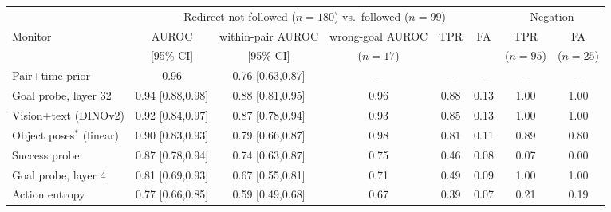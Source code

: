 \begin{tabular}{lccccccc}
\toprule
 & \multicolumn{5}{c}{Redirect not followed ($n{=}180$) vs.\ followed ($n{=}99$)} & \multicolumn{2}{c}{Negation} \\
\cmidrule(lr){2-6}\cmidrule(lr){7-8}
Monitor & AUROC & within-pair AUROC & wrong-goal AUROC & TPR & FA & TPR & FA \\
 & [95\% CI] & [95\% CI] & ($n{=}17$) & & & ($n{=}95$) & ($n{=}25$) \\
\midrule
Pair+time prior & 0.96 & 0.76 {\scriptsize[0.63,0.87]} & -- & -- & -- & -- & -- \\
\midrule
Goal probe, layer 32 & 0.94 {\scriptsize[0.88,0.98]} & 0.88 {\scriptsize[0.81,0.95]} & 0.96 & 0.88 & 0.13 & 1.00 & 1.00 \\
Vision+text (DINOv2) & 0.92 {\scriptsize[0.84,0.97]} & 0.87 {\scriptsize[0.78,0.94]} & 0.93 & 0.85 & 0.13 & 1.00 & 1.00 \\
Object poses$^\ast$ (linear) & 0.90 {\scriptsize[0.83,0.93]} & 0.79 {\scriptsize[0.66,0.87]} & 0.98 & 0.81 & 0.11 & 0.89 & 0.80 \\
Success probe & 0.87 {\scriptsize[0.78,0.94]} & 0.74 {\scriptsize[0.63,0.87]} & 0.75 & 0.46 & 0.08 & 0.07 & 0.00 \\
Goal probe, layer 4 & 0.81 {\scriptsize[0.69,0.93]} & 0.67 {\scriptsize[0.55,0.81]} & 0.71 & 0.49 & 0.09 & 1.00 & 1.00 \\
Action entropy & 0.77 {\scriptsize[0.66,0.85]} & 0.59 {\scriptsize[0.49,0.68]} & 0.67 & 0.39 & 0.07 & 0.21 & 0.19 \\
\bottomrule
\end{tabular}